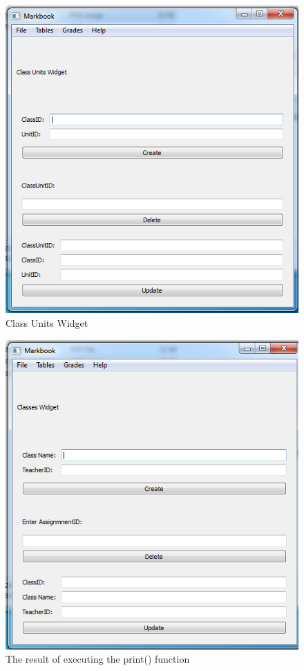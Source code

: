 \begin{figure}[H]
    \includegraphics[width=\textwidth]{./Images/class units.png}
    \caption{Class Units Widget} \label{}
\end{figure}

\begin{figure}[H]
    \includegraphics[width=\textwidth]{./Images/classes.png}
    \caption{The result of executing the print() function} \label{}
\end{figure}

